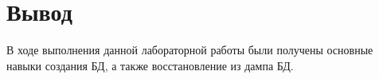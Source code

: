 \section*{Вывод}

В  ходе  выполнения  данной  лабораторной  работы  были получены основные навыки создания БД, а также восстановление из дампа БД.